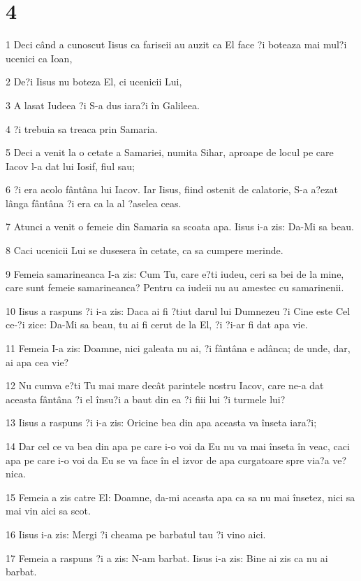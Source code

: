 \chapter{4}

\par 1 Deci când a cunoscut Iisus ca fariseii au auzit ca El face ?i boteaza mai mul?i ucenici ca Ioan,
\par 2 De?i Iisus nu boteza El, ci ucenicii Lui,
\par 3 A lasat Iudeea ?i S-a dus iara?i în Galileea.
\par 4 ?i trebuia sa treaca prin Samaria.
\par 5 Deci a venit la o cetate a Samariei, numita Sihar, aproape de locul pe care Iacov l-a dat lui Iosif, fiul sau;
\par 6 ?i era acolo fântâna lui Iacov. Iar Iisus, fiind ostenit de calatorie, S-a a?ezat lânga fântâna ?i era ca la al ?aselea ceas.
\par 7 Atunci a venit o femeie din Samaria sa scoata apa. Iisus i-a zis: Da-Mi sa beau.
\par 8 Caci ucenicii Lui se dusesera în cetate, ca sa cumpere merinde.
\par 9 Femeia samarineanca I-a zis: Cum Tu, care e?ti iudeu, ceri sa bei de la mine, care sunt femeie samarineanca? Pentru ca iudeii nu au amestec cu samarinenii.
\par 10 Iisus a raspuns ?i i-a zis: Daca ai fi ?tiut darul lui Dumnezeu ?i Cine este Cel ce-?i zice: Da-Mi sa beau, tu ai fi cerut de la El, ?i ?i-ar fi dat apa vie.
\par 11 Femeia I-a zis: Doamne, nici galeata nu ai, ?i fântâna e adânca; de unde, dar, ai apa cea vie?
\par 12 Nu cumva e?ti Tu mai mare decât parintele nostru Iacov, care ne-a dat aceasta fântâna ?i el însu?i a baut din ea ?i fiii lui ?i turmele lui?
\par 13 Iisus a raspuns ?i i-a zis: Oricine bea din apa aceasta va înseta iara?i;
\par 14 Dar cel ce va bea din apa pe care i-o voi da Eu nu va mai înseta în veac, caci apa pe care i-o voi da Eu se va face în el izvor de apa curgatoare spre via?a ve?nica.
\par 15 Femeia a zis catre El: Doamne, da-mi aceasta apa ca sa nu mai însetez, nici sa mai vin aici sa scot.
\par 16 Iisus i-a zis: Mergi ?i cheama pe barbatul tau ?i vino aici.
\par 17 Femeia a raspuns ?i a zis: N-am barbat. Iisus i-a zis: Bine ai zis ca nu ai barbat.
